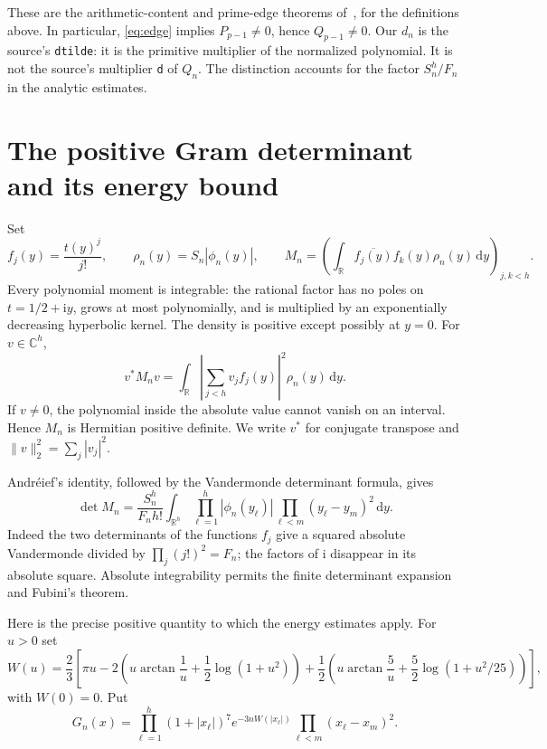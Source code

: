 \documentclass[11pt]{article}
\numberwithin{equation}{section}
\newcommand{\R}{\mathbb R}
\newcommand{\C}{\mathbb C}
\newcommand{\ii}{\mathrm i}
\newcommand{\dd}{\,\mathrm d}
\begin{document}
These are the arithmetic-content and prime-edge theorems of~\cite{Tang},
for the definitions above. In particular, \eqref{eq:edge} implies
$P_{p-1}\ne0$, hence $Q_{p-1}\ne0$.
Our $d_n$ is the source's \texttt{dtilde}: it is the primitive multiplier
of the normalized polynomial. It is not the source's multiplier
\texttt{d} of $Q_n$. The distinction accounts for the factor $S_n^h/F_n$
in the analytic estimates.

\section{The positive Gram determinant and its energy bound}
\label{sec:energy}

Set
\[
 f_j(y)=\frac{t(y)^j}{j!},\qquad \rho_n(y)=S_n|\phi_n(y)|,
 \qquad
 M_n=\left(\int_\R\overline{f_j(y)}f_k(y)\rho_n(y)\dd y\right)_{j,k<h}.
\]
Every polynomial moment is integrable: the rational factor has no poles
on $t=1/2+\ii y$, grows at most polynomially, and is multiplied by an
exponentially decreasing hyperbolic kernel. The density is positive
except possibly at $y=0$. For $v\in\C^h$,
\begin{equation}\label{eq:quadratic}
 v^*M_nv=\int_\R\left|\sum_{j<h}v_jf_j(y)\right|^2\rho_n(y)\dd y.
\end{equation}
If $v\ne0$, the polynomial inside the absolute value cannot vanish
on an interval. Hence $M_n$ is Hermitian positive definite. We write
$v^*$ for conjugate transpose and $\|v\|_2^2=\sum_j|v_j|^2$.

Andr\'eief's identity, followed by the Vandermonde determinant formula,
gives
\begin{equation}\label{eq:heine}
 \det M_n=\frac{S_n^h}{F_nh!}
 \int_{\R^h}\prod_{\ell=1}^h|\phi_n(y_\ell)|
                 \prod_{\ell<m}(y_\ell-y_m)^2\dd y.
\end{equation}
Indeed the two determinants of the functions $f_j$ give a squared
absolute Vandermonde divided by $\prod_j(j!)^2=F_n$; the factors of
$\ii$ disappear in its absolute square. Absolute integrability permits
the finite determinant expansion and Fubini's theorem.

Here is the precise positive quantity to which the energy estimates
apply. For $u>0$ set
\[
 W(u)=\frac23\left[\pi u
 -2\left(u\arctan\frac1u+\frac12\log(1+u^2)\right)
 +\frac12\left(u\arctan\frac5u+\frac52\log(1+u^2/25)\right)\right],
\]
with $W(0)=0$. Put
\[
 G_n(x)=\prod_{\ell=1}^h
           (1+|x_\ell|)^7 e^{-3nW(|x_\ell|)}
                       \prod_{\ell<m}(x_\ell-x_m)^2.
\]
\end{document}
